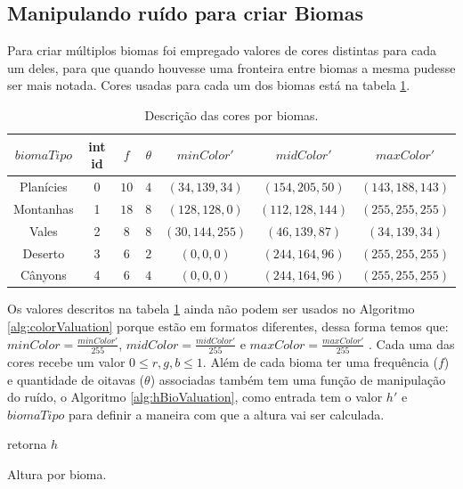 \subsection{Manipulando ruído para criar Biomas}
Para criar múltiplos biomas foi empregado valores de cores distintas para cada um deles, 
para que quando houvesse uma fronteira entre biomas a mesma pudesse ser mais notada. 
Cores usadas para cada um dos biomas está na tabela \ref{tab:bioColors}.
\begin{table}[H]
    \centering
    \caption{Descrição das cores por biomas.}
    \label{tab:bioColors}
    \begin{tabular}{| c | c c c c c c|}
        \hline
        $biomaTipo$ & int id & $f$ & $\theta$ & $minColor'$ & $midColor'$ & $maxColor'$\\
        \hline
        Planícies   & 0 & $10$ & $4$ & $(34, 139, 34) $ & $(154, 205, 50) $ & $(143,188,143)  $  \\
        Montanhas & 1 & $18$ & $8$ & $(128, 128, 0) $ & $(112, 128, 144)$ & $(255, 255, 255)$  \\
        Vales   & 2 & $8$  & $8$ & $(30, 144, 255)$ & $(46, 139, 87)  $ & $(34, 139, 34)  $  \\
        Deserto   & 3 & $6$  & $2$ & $(0, 0, 0)     $ & $(244, 164, 96) $ & $(255, 255, 255)$  \\
        Cânyons  & 4 & $6$  & $4$ & $(0, 0, 0)     $ & $(244, 164, 96) $ & $(255, 255, 255)$  \\
        \hline
    \end{tabular}
\end{table}

Os valores descritos na tabela \ref{tab:bioColors} ainda não podem ser usados no
Algoritmo \ref{alg:colorValuation} porque estão em formatos diferentes, dessa forma temos
que: $minColor = \frac{minColor'}{255}$, $midColor = \frac{midColor'}{255}$ e $maxColor = \frac{maxColor'}{255}$ . Cada uma das cores recebe um valor
$0 \leq r, g, b \leq 1$.
Além de cada bioma ter uma frequência ($f$) e quantidade de oitavas ($\theta$) associadas
também tem uma função de manipulação do ruído, o Algoritmo \ref{alg:hBioValuation}, 
como entrada tem o valor $h'$ e $biomaTipo$ para definir a maneira com que a altura vai ser
calculada.

\begin{algorithm}[H]\label{alg:hBioValuation}
    retorna $h$\;
    \caption{Altura por bioma.}
\end{algorithm}

